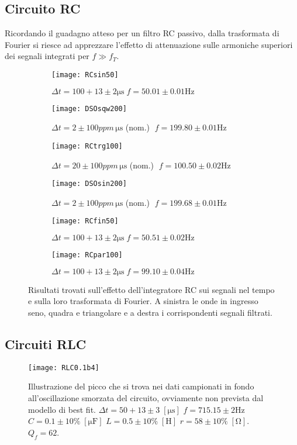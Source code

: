 \documentclass{article}[a4paper, oneside, 11pt]
\begin{document}
\subsection{Circuito RC}
Ricordando il guadagno atteso per un filtro RC passivo, dalla trasformata
di Fourier si riesce ad apprezzare l'effetto di attenuazione sulle armoniche
superiori dei segnali integrati per $f \gg f_T$.
\begin{figure}[!htb]
\centering
	\begin{subfigure}{.5\textwidth}
	\texttt{[image: RCsin50]}
	\caption{$\Delta t = 100 + 13 \pm 2 \si{\us} \; f = 50.01 \pm 0.01 \si{\Hz}$}
	\texttt{[image: DSOsqw200]}
	\caption{$\Delta t = 2 \pm 100 \si{ppm \, \us}$ (nom.)
	$\; f = 199.80 \pm 0.01 \si{\Hz}$}
	\texttt{[image: RCtrg100]}
	\caption{$\Delta t = 20 \pm 100 \si{ppm \, \us}$ (nom.)
	$ \; f = 100.50 \pm 0.02 \si{\Hz}$}
\label{fig: RCin}
	\end{subfigure}%
	\begin{subfigure}{.5\textwidth}
	\texttt{[image: DSOsin200]}
	\caption{$\Delta t = 2 \pm 100 \si{ppm \, \us}$ (nom.)
	$\; f = 199.68 \pm 0.01 \si{\Hz}$}
	\texttt{[image: RCfin50]}
	\caption{$\Delta t = 100 + 13 \pm 2 \si{\us} \; f = 50.51 \pm 0.02 \si{\Hz}$}
	\texttt{[image: RCpar100]}
	\caption{$\Delta t = 100 + 13 \pm 2 \si{\us} \; f = 99.10 \pm 0.04 \si{\Hz}$}
\label{fig: Rcint}
	\end{subfigure}%
	\caption{Risultati trovati sull'effetto dell'integratore RC sui segnali
			nel tempo e sulla loro trasformata di Fourier. A sinistra le
			onde in ingresso seno, quadra e triangolare e a destra i corrispondenti 
		 	segnali filtrati. \label{fig: RCall}}
\end{figure}

\subsection{Circuiti RLC}
\begin{figure}[!htb]
\centering
	\texttt{[image: RLC0.1b4]}
	\caption{Illustrazione del picco che si trova nei dati campionati
			in fondo all'oscillazione smorzata del circuito, ovviamente
			non prevista dal modello di best fit. 
			$\Delta t = 50 + 13 \pm 3 \; [\si{\us}]$ $f = 715.15 \pm 2 \si{\Hz}$
			$C = 0.1 \pm 10\% \; [\si{\micro\F}]$ $L = 0.5 \pm 10 \% \;
			[\si{\henry}]$ $r = 58 \pm 10\%	\; [\si{\ohm}]$.
			$Q_f = 62$.	\label{fig: RLC0.1b5}}
\end{figure}
\end{document}
